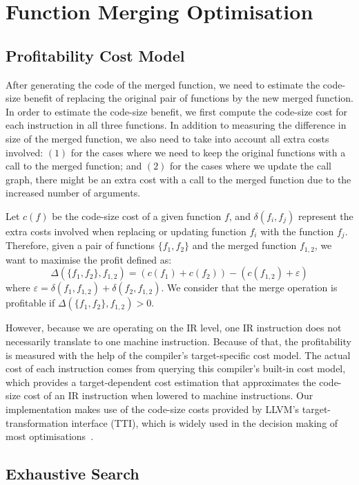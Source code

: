
\chapter{Function Merging Optimisation}

\section{Profitability Cost Model}\label{sec:profit-model}

After generating the code of the merged function, we need to estimate the
code-size benefit of replacing the original pair of functions by the new merged
function.
In order to estimate the code-size benefit, we first compute the code-size cost
for each instruction in all three functions.
In addition to measuring the difference in size of the merged function, we also
need to take into account all extra costs involved:
$(1)$ for the cases where we need to keep the original functions with a call to
the merged function;
and $(2)$ for the cases where we update the call graph, there might be an extra
cost with a call to the merged function due to the increased number of arguments.

Let $c(f)$ be the code-size cost of a given function $f$, and
$\delta(f_i, f_j)$ represent the extra costs involved when replacing or
updating function $f_i$ with the function $f_j$.
Therefore, given a pair of functions $\{f_1,f_2\}$ and the merged function
$f_{1,2}$, we want to maximise the profit defined as:
\[
  \Delta(\{f_1,f_2\},f_{1,2}) = (c(f_1)+c(f_2)) - (c(f_{1,2}) + \varepsilon)
\]
where $\varepsilon = \delta(f_1, f_{1,2}) + \delta(f_2, f_{1,2})$.
We consider that the merge operation is profitable if $\Delta(\{f_1,f_2\},f_{1,2})>0$.

However, because we are operating on the IR level, one IR instruction does not
necessarily translate to one machine instruction.
Because of that, the profitability is measured with the help of the compiler's
target-specific cost model.
The actual cost of each instruction comes from querying this compiler's built-in
cost model, which provides a target-dependent cost estimation that approximates
the code-size cost of an IR instruction when lowered to machine instructions.
Our implementation makes use of the code-size costs provided by LLVM's
target-transformation interface (TTI), which is widely used in the decision
making of most optimisations~\cite{porpodas18b,pohl18}.


\section{Exhaustive Search}


